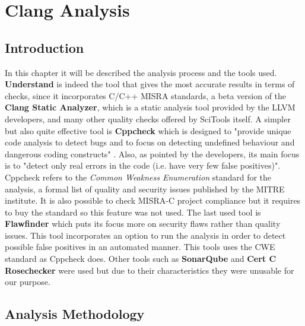 \chapter{Clang Analysis}

\section{Introduction}

In this chapter it will be described the analysis process and the tools used.\newline\newline
\textbf{Understand} is indeed the tool that gives the most accurate results in terms of checks, since it incorporates C/C++ MISRA standards, a beta version of the \textbf{Clang Static Analyzer}, which is a static analysis tool provided by the LLVM developers, and many other quality checks offered by SciTools itself.\newline
A simpler but also quite effective tool is \textbf{Cppcheck} which is designed to "provide unique code analysis to detect bugs and to focus on detecting undefined behaviour and dangerous coding constructs" \cite{bibitem2}. Also, as pointed by the developers, its main focus is to  "detect only real errors in the code (i.e. have very few false positives)". Cppcheck refers to the \textsl{Common Weakness Enumeration} standard for the analysis, a formal list of quality and security issues published by the MITRE institute. It is also possible to check MISRA-C project compliance but it requires to buy the standard so this feature was not used. \newline
The last used tool is \textbf{Flawfinder} which puts its focus more on security flaws rather than quality issues. This tool incorporates an option to run the analysis in order to detect possible false positives in an automated manner. This tools uses the CWE standard as Cppcheck does.\newline
Other tools such as \textbf{SonarQube} and \textbf{Cert C Rosechecker} were used but due to their characteristics they were unusable for our purpose.
\pagebreak

\section{Analysis Methodology}

